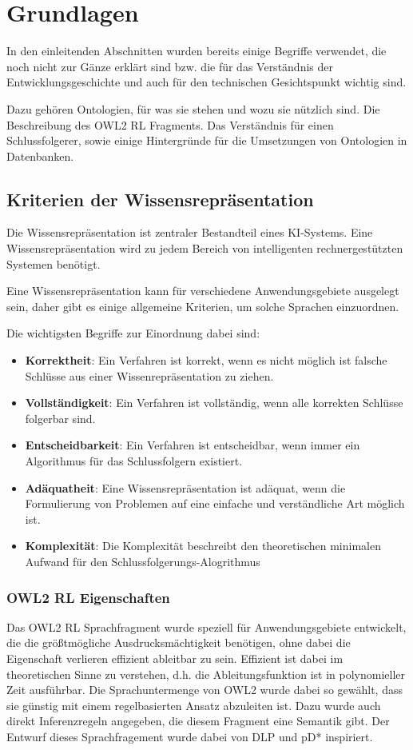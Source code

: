 \chapter{Grundlagen}
In den einleitenden Abschnitten wurden bereits einige Begriffe verwendet, die noch nicht zur Gänze erklärt sind bzw. die für das Verständnis der Entwicklungsgeschichte und auch für den technischen Gesichtspunkt wichtig sind.

Dazu gehören Ontologien, für was sie stehen und wozu sie nützlich sind. Die Beschreibung des OWL2 RL Fragments. Das Verständnis für einen Schlussfolgerer, sowie einige Hintergründe für die Umsetzungen von Ontologien in Datenbanken.

\section{Kriterien der Wissensrepräsentation}

Die Wissensrepräsentation ist zentraler Bestandteil eines KI-Systems. Eine Wissensrepräsentation wird zu jedem Bereich von intelligenten rechnergestützten Systemen benötigt.

Eine Wissensrepräsentation kann für verschiedene Anwendungsgebiete ausgelegt sein, daher gibt es einige allgemeine Kriterien, um solche Sprachen einzuordnen.

Die wichtigsten Begriffe zur Einordnung dabei sind:
\begin{itemize}
  \item \textbf{Korrektheit}:
Ein Verfahren ist korrekt, wenn es nicht möglich ist falsche Schlüsse aus einer Wissenrepräsentation zu ziehen.
 \item \textbf{Vollständigkeit}:
Ein Verfahren ist vollständig, wenn alle korrekten Schlüsse folgerbar sind.
 \item \textbf{Entscheidbarkeit}:
Ein Verfahren ist entscheidbar, wenn immer ein Algorithmus für das Schlussfolgern existiert.
 \item \textbf{Adäquatheit}:
Eine Wissensrepräsentation ist adäquat, wenn die Formulierung von Problemen auf eine einfache und verständliche Art möglich ist.
 \item \textbf{Komplexität}:
Die Komplexität beschreibt den theoretischen minimalen Aufwand für den Schlussfolgerungs-Alogrithmus
\end{itemize}


\subsection{OWL2 RL Eigenschaften}
Das OWL2 RL Sprachfragment wurde speziell für Anwendungsgebiete entwickelt, die die größtmögliche Ausdrucksmächtigkeit benötigen, ohne dabei die Eigenschaft verlieren effizient ableitbar zu sein. Effizient ist dabei im theoretischen Sinne zu verstehen, d.h. die Ableitungsfunktion ist in polynomieller Zeit ausführbar. Die Sprachuntermenge von OWL2 wurde dabei so gewählt, dass sie günstig mit einem regelbasierten Ansatz abzuleiten ist. Dazu wurde auch direkt Inferenzregeln angegeben, die diesem Fragment eine Semantik gibt. Der Entwurf dieses Sprachfragement wurde dabei von DLP \cite{Grosof2003} und pD* \cite{Li2006} inspiriert.

